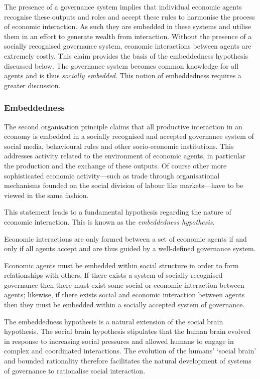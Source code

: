 The presence of a governance system implies that individual economic agents recognise these outputs and roles and accept these rules to harmonise the process of economic interaction. As such they are embedded in these systems and utilise them in an effort to generate wealth from interaction. Without the presence of a socially recognised governance system, economic interactions between agents are extremely costly. This claim provides the basis of the embeddedness hypothesis discussed below. The governance system becomes common knowledge for all agents and is thus \emph{socially embedded}. This notion of embeddedness requires a greater discussion.

\subsubsection{Embeddedness}

The second organisation principle claims that all productive interaction in an economy is embedded in a socially recognised and accepted governance system of social media, behavioural rules and other socio-economic institutions. This addresses activity related to the environment of economic agents, in particular the production and the exchange of these outputs. Of course other more sophisticated economic activity---such as trade through organisational mechanisms founded on the social division of labour like markets---have to be viewed in the same fashion.

This statement leads to a fundamental hypothesis regarding the nature of economic interaction. This is known as the \emph{embeddedness hypothesis}.
\begin{hypothesis} \label{ax:embeddednesshypothesis}
Economic interactions are only formed between a set of economic agents if and only if all agents accept and are thus guided by a well-defined governance system.
\end{hypothesis}
Economic agents must be embedded within social structure in order to form relationships with others. If there exists a system of socially recognised governance then there must exist some social or economic interaction between agents; likewise, if there exists social and economic interaction between agents then they must be embedded within a socially accepted system of governance.

The embeddedness hypothesis is a natural extension of the social brain hypothesis. The social brain hypothesis stipulates that the human brain evolved in response to increasing social pressures and allowed humans to engage in complex and coordinated interactions. The evolution of the humans' `social brain' and bounded rationality therefore facilitates the natural development of systems of governance to rationalise social interaction. 

